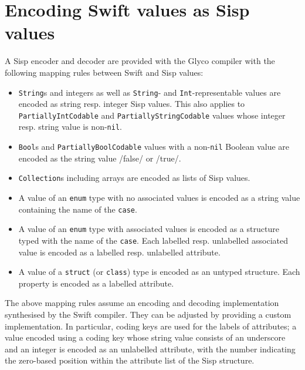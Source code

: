 \documentclass[main.tex]{subfiles}
\begin{document}
\section*{Encoding Swift values as Sisp values}
A Sisp encoder and decoder are provided with the Glyco compiler with the following mapping rules between Swift and Sisp values:
\begin{itemize}
	
	\item \texttt{String}s and integers as well as \texttt{String}- and \texttt{Int}-representable values are encoded as string resp. integer Sisp values. This also applies to \texttt{PartiallyIntCodable} and \texttt{PartiallyStringCodable} values whose integer resp. string value is non-\texttt{nil}.
	
	\item \texttt{Bool}s and \texttt{PartiallyBoolCodable} values with a non-\texttt{nil} Boolean value are encoded as the string value \iil/false/ or \iil/true/.
	
	\item \texttt{Collection}s including arrays are encoded as lists of Sisp values.
	
	\item A value of an \texttt{enum} type with no associated values is encoded as a string value containing the name of the \texttt{case}.
	
	\item A value of an \texttt{enum} type with associated values is encoded as a structure typed with the name of the \texttt{case}. Each labelled resp. unlabelled associated value is encoded as a labelled resp. unlabelled attribute.
	
	\item A value of a \texttt{struct} (or \texttt{class}) type is encoded as an untyped structure. Each property is encoded as a labelled attribute.
	
\end{itemize}

The above mapping rules assume an encoding and decoding implementation synthesised by the Swift compiler. They can be adjusted by providing a custom implementation. In particular, coding keys are used for the labels of attributes; a value encoded using a coding key whose string value consists of an underscore and an integer is encoded as an unlabelled attribute, with the number indicating the zero-based position within the attribute list of the Sisp structure.

\biblio{}
\onlyinsubfile{\glsaddall\printglossaries}
\end{document}
